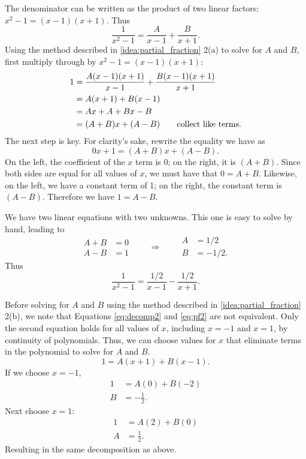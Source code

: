 {The denominator can be written as the product of two linear factors: $x^2-1 = (x-1)(x+1)$. Thus 
\begin{equation}\label{eq:decomp2}
 \frac{1}{x^2-1} = \frac{A}{x-1} + \frac{B}{x+1}.
\end{equation}
Using the method described in \autoref{idea:partial_fraction} 2(a) to solve for $A$ and $B$, first multiply through by $x^2-1 = (x-1)(x+1)$:
\begin{align}\label{eq:pf2}
	1
	&= \frac{A(x-1)(x+1)}{x-1}+\frac{B(x-1)(x+1)}{x+1} \notag\\
	&= A(x+1) + B(x-1)\\
	&= Ax+A + Bx-B \notag\\
	&= (A+B)x + (A-B)\qquad\text{collect like terms.}\notag
\end{align}
The next step is key. %
For clarity's sake, rewrite the equality we have as
$$0x+1 = (A+B)x+(A-B).$$
On the left, the coefficient of the $x$ term is 0; on the right, it is $(A+B)$. Since both sides are equal for all values of $x$, we must have that $0=A+B$. Likewise, on the left, we have a constant term of 1; on the right, the constant term is $(A-B)$. Therefore we have $1=A-B$.

We have two linear equations with two unknowns. This one is easy to solve by hand, leading to 
\[
 \begin{aligned}A+B&=0\\A-B&=1\end{aligned}
 \qquad\Rightarrow\qquad
 \begin{aligned}A&=1/2\\B&=-1/2.\end{aligned}
\]
Thus
\[\frac{1}{x^2-1}=\frac{1/2}{x-1}-\frac{1/2}{x+1}.\]

Before solving for $A$ and $B$ using the method described in \autoref{idea:partial_fraction} 2(b), we note that Equations \eqref{eq:decomp2} and \eqref{eq:pf2} are not equivalent. Only the second equation holds for all values of $x$, including $x=-1$ and $x=1$, by continuity of polynomials. Thus, we can choose values for $x$ that eliminate terms in the polynomial to solve for $A$ and $B$.
\[1=A(x+1) + B(x-1).\]
If we choose $x=-1$,
\begin{align*}
 1&=A(0) + B(-2) \\
 B&=-\frac{1}{2}.
\end{align*}
Next choose $x=1$:
\begin{align*}
 1&=A(2) + B(0) \\
 A&=\frac{1}{2}.
\end{align*}
Resulting in the same decomposition as above.}

